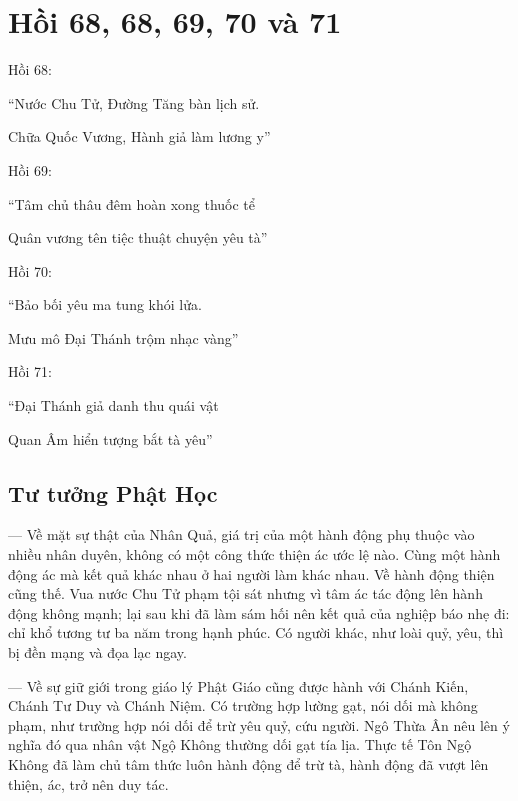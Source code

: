 \chapter{Hồi 68, 68, 69, 70 và 71} %
\label{cha:hoi_68_69}

Hồi 68:

\begin{itshape}
``Nước Chu Tử, Đường Tăng bàn lịch sử.

Chữa Quốc Vương, Hành giả làm lương y''
\end{itshape}

Hồi 69:

\begin{itshape}
``Tâm chủ thâu đêm hoàn xong thuốc tể

Quân vương tên tiệc thuật chuyện yêu tà''
\end{itshape}

Hồi 70:

\begin{itshape}
``Bảo bối yêu ma tung khói lửa.

Mưu mô Đại Thánh trộm nhạc vàng''
\end{itshape}

Hồi 71:

\begin{itshape}
``Đại Thánh giả danh thu quái vật

Quan Âm hiển tượng bắt tà yêu''
\end{itshape}

\section{Tư tưởng Phật Học} %
\label{sec:68_69_phat_hoc}

— Về mặt sự thật của Nhân Quả, giá trị của một hành động phụ thuộc vào nhiều nhân duyên, không có một công thức thiện ác ước lệ nào. Cùng một hành động ác mà kết quả khác nhau ở hai người làm khác nhau. Về hành động thiện cũng thế. Vua nước Chu Tử phạm tội sát nhưng vì tâm ác tác động lên hành động không mạnh; lại sau khi đã làm sám hối nên kết quả của nghiệp báo nhẹ đi: chỉ khổ tương tư ba năm trong hạnh phúc. Có người khác, như loài quỷ, yêu, thì bị đền mạng và đọa lạc ngay.

— Về sự giữ giới trong giáo lý Phật Giáo cũng được hành với Chánh Kiến, Chánh Tư Duy và Chánh Niệm. Có trường hợp lường gạt, nói dối mà không phạm, như trường hợp nói dối để trừ yêu quỷ, cứu người. Ngô Thừa Ân nêu lên ý nghĩa đó qua nhân vật Ngộ Không thường dối gạt tía lịa. Thực tế Tôn Ngộ Không đã làm chủ tâm thức luôn hành động để trừ tà, hành động đã vượt lên thiện, ác, trở nên duy tác.

